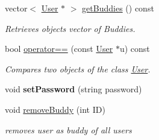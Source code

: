 \begin{DoxyCompactItemize}
vector$<$ \hyperlink{class_user}{User} $\ast$ $>$ \hyperlink{group___user_ga47d6c3dccd2b1c3050fbd0f572bac6f8}{get\+Buddies} () const
\begin{DoxyCompactList}\small\item\em Retrieves object\textquotesingle{}s vector of Buddies. \end{DoxyCompactList}\item 
bool \hyperlink{group___user_gab403e4acde558a3f968aa13b74960da5}{operator==} (const \hyperlink{class_user}{User} $\ast$u) const
\begin{DoxyCompactList}\small\item\em Compares two objects of the class \hyperlink{class_user}{User}. \end{DoxyCompactList}\item 
void {\bfseries set\+Password} (string password)
\item 
void \hyperlink{group___user_ga280617ba3ac500d59e6eb8af09dc3487}{remove\+Buddy} (int ID)
\begin{DoxyCompactList}\small\item\em removes user as buddy of all users \end{DoxyCompactList}\end{DoxyCompactItemize}
